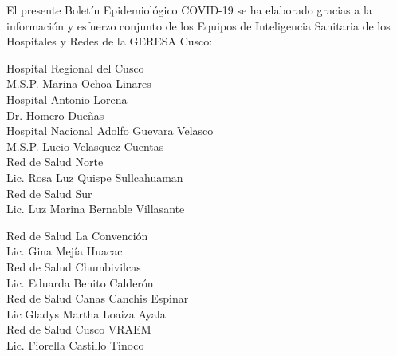 \documentclass[12pt,a4paper,openany]{book}
\begin{document}
	\centering
	{\large El presente Boletín Epidemiológico COVID-19 se ha elaborado gracias a la información y esfuerzo conjunto de los Equipos de Inteligencia Sanitaria de los Hospitales y Redes de la GERESA Cusco:
		
		\vspace{0.5cm}
		\noindent
		\begin{minipage}[t]{.45\textwidth}
			\centering
			Hospital Regional del Cusco \\
			M.S.P. Marina Ochoa Linares \vspace{0.5cm}\\
			Hospital Antonio Lorena \\
			Dr. Homero Dueñas \vspace{.5cm}\\
			Hospital Nacional Adolfo Guevara Velasco\\
			M.S.P. Lucio Velasquez Cuentas \vspace{.5cm}\\
			Red de Salud Norte \\
			Lic. Rosa Luz Quispe Sullcahuaman \vspace{0.5cm}\\
			Red de Salud Sur\\
			Lic. Luz Marina Bernable Villasante \vspace{0.5cm}\\	
		\end{minipage}
		\hfill
		\noindent
		\begin{minipage}[t]{.45\textwidth}
			\centering
			Red de Salud La Convención\\
			Lic. Gina Mejía Huacac\vspace{0.5cm}\\
			Red de Salud Chumbivilcas\\
			Lic. Eduarda Benito Calderón \vspace{.5cm}\\
			Red de Salud Canas Canchis Espinar\\
			Lic Gladys Martha Loaiza Ayala \vspace{.5cm}\\
			Red de Salud Cusco VRAEM \\
			Lic. Fiorella Castillo Tinoco\vspace{0.5cm}\\	
		\end{minipage}
}
\end{document}
